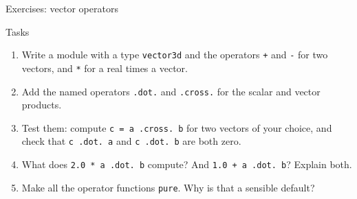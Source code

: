 \begin{frame}{Exercises: vector operators}
  \begin{block}{Tasks}
    \begin{enumerate}
      \item Write a module with a type \texttt{vector3d} and the operators \texttt{+} and \texttt{-} for two vectors, and \texttt{*} for a real times a vector.
      \item Add the named operators \texttt{.dot.} and \texttt{.cross.} for the scalar and vector products.
      \item Test them: compute \mbox{\texttt{c = a .cross. b}} for two vectors of your choice, and check that \mbox{\texttt{c .dot. a}} and \mbox{\texttt{c .dot. b}} are both zero.
      \item What does \mbox{\texttt{2.0 * a .dot. b}} compute? And \mbox{\texttt{1.0 + a .dot. b}}? Explain both.
      \item Make all the operator functions \texttt{pure}. Why is that a sensible default?
    \end{enumerate}
  \end{block}
\end{frame}



